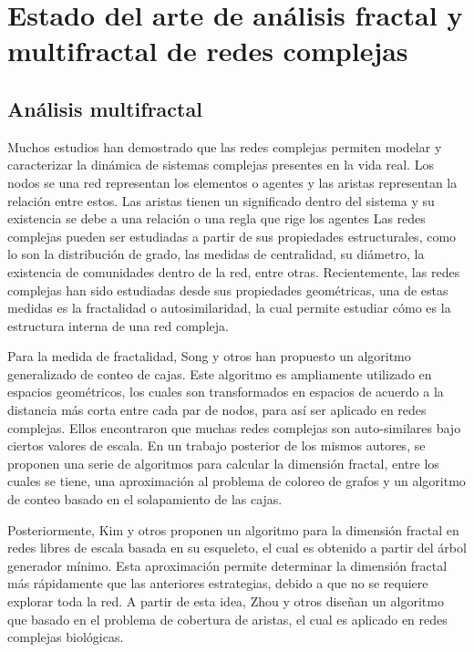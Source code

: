 \section{Estado del arte de análisis fractal y multifractal de redes complejas}

\subsection{Análisis multifractal}

Muchos estudios han demostrado que las redes complejas permiten modelar y caracterizar la dinámica de sistemas complejas presentes en la vida real\cite{BarabasiNetwork}. Los nodos se una red representan los elementos o agentes y las aristas representan la relación entre estos. Las aristas tienen un significado dentro del sistema y su existencia se debe a una relación o una regla que rige los agentes Las redes complejas pueden ser estudiadas a partir de sus propiedades estructurales, como lo son la distribución de grado, las medidas de centralidad, su diámetro, la existencia de comunidades dentro de la red, entre otras. Recientemente, las redes complejas han sido estudiadas desde sus propiedades geométricas, una de estas medidas es la fractalidad o autosimilaridad, la cual permite estudiar cómo es la estructura interna de una red compleja\cite{Estrada2011}.

Para la medida de fractalidad, Song y otros\cite{Song2005} han propuesto un algoritmo generalizado de conteo de cajas. Este algoritmo es ampliamente utilizado en espacios geométricos, los cuales son transformados en espacios de acuerdo a la distancia más corta entre cada par de nodos, para así ser aplicado en redes complejas. Ellos encontraron que muchas redes complejas son auto-similares bajo ciertos valores de escala. En un trabajo posterior de los mismos autores\cite{Song2007}, se proponen una serie de algoritmos para calcular la dimensión fractal, entre los cuales se tiene, una aproximación al problema de coloreo de grafos y un algoritmo de conteo basado en el solapamiento de las cajas.

Posteriormente, Kim y otros\cite{Kim2007A}\cite{Kim2007B} proponen un algoritmo para la dimensión fractal en redes libres de escala basada en su esqueleto, el cual es obtenido a partir del árbol generador mínimo. Esta aproximación permite determinar la dimensión fractal más rápidamente que las anteriores estrategias, debido a que no se requiere explorar toda la red. A partir de esta idea, Zhou y otros\cite{Zhou2007} diseñan un algoritmo que basado en el problema de cobertura de aristas, el cual es aplicado en redes complejas biológicas. 

